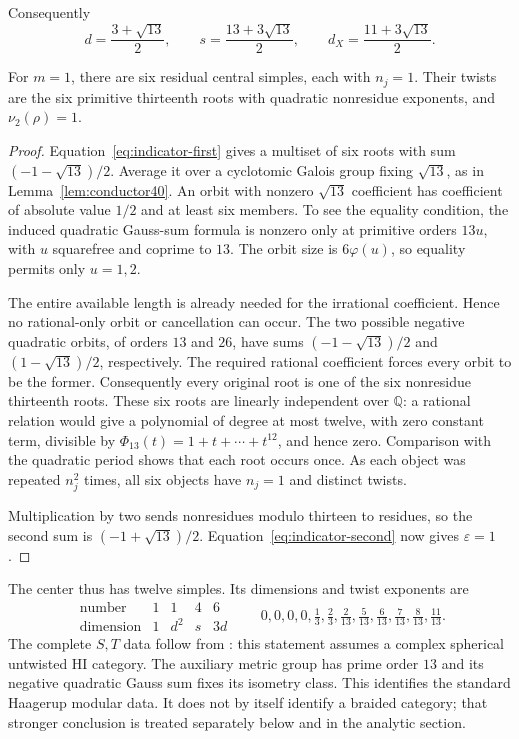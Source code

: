Consequently
\begin{equation}
 d=\frac{3+\sqrt{13}}2,\qquad
 s=\frac{13+3\sqrt{13}}2,\qquad
 d_X=\frac{11+3\sqrt{13}}2.
 \label{eq:haagerup-dimensions}
\end{equation}
\begin{lemma}\label{lem:six-residual-twists}
For $m=1$, there are six residual central simples, each with $n_j=1$.
Their twists are the six primitive thirteenth roots with quadratic
nonresidue exponents, and $\nu_2(\rho)=1$.
\end{lemma}
\begin{proof}
Equation~\eqref{eq:indicator-first} gives a multiset of six roots
with sum $(-1-\sqrt{13})/2$. Average it over a cyclotomic Galois group
fixing $\sqrt{13}$, as in Lemma~\ref{lem:conductor40}. An orbit with
nonzero $\sqrt{13}$ coefficient has coefficient of absolute value
$1/2$ and at least six members. To see the equality condition, the
induced quadratic Gauss-sum formula is nonzero only at primitive
orders $13u$, with $u$ squarefree and coprime to $13$. The orbit size
is $6\varphi(u)$, so equality permits only $u=1,2$.

The entire available length is already needed for the irrational
coefficient. Hence no rational-only orbit or cancellation can occur.
The two possible negative quadratic orbits, of orders $13$ and $26$,
have sums $(-1-\sqrt{13})/2$ and $(1-\sqrt{13})/2$, respectively.
The required rational coefficient forces every orbit to be the former.
Consequently every original root is one of the six nonresidue
thirteenth roots. These six roots are linearly independent over
$\mathbb Q$: a rational relation would give a polynomial of degree
at most twelve, with zero constant term, divisible by
$\Phi_{13}(t)=1+t+\cdots+t^{12}$, and hence zero.
Comparison with the quadratic period shows that each root occurs
once. As each object was repeated $n_j^2$ times, all six objects have
$n_j=1$ and distinct twists.

Multiplication by two sends nonresidues modulo thirteen to residues,
so the second sum is $(-1+\sqrt{13})/2$.
Equation~\eqref{eq:indicator-second} now gives $\varepsilon=1$.
\end{proof}

The center thus has twelve simples. Its dimensions and twist exponents are
\[
 \begin{array}{c|cccc}
 \text{number}&1&1&4&6\\\hline
 \text{dimension}&1&d^2&s&3d
 \end{array}
 \qquad
 0,0,0,0,\tfrac13,\tfrac23,
 \tfrac2{13},\tfrac5{13},\tfrac6{13},
 \tfrac7{13},\tfrac8{13},\tfrac{11}{13}.
\]
The complete $S,T$ data follow from
\cite[Theorem~A(2), equivalently Theorem~5.1]{GSY}: this statement assumes
a complex spherical untwisted HI category. The auxiliary metric group
has prime order $13$ and its negative quadratic Gauss sum fixes its
isometry class. This identifies the standard Haagerup modular data.
It does not by itself identify a braided category; that stronger
conclusion is treated separately below and in the analytic section.

